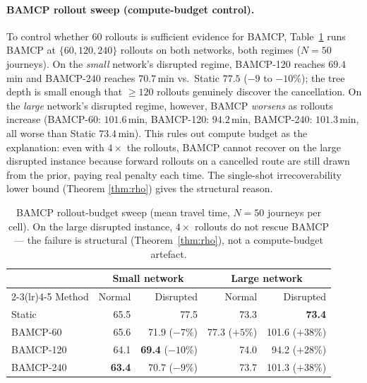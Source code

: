 \documentclass[11pt]{article}
\theoremstyle{definition}
\theoremstyle{remark}
\begin{document}
\paragraph{BAMCP rollout sweep (compute-budget control).} To
control whether $60$ rollouts is sufficient evidence for
BAMCP, Table~\ref{tab:bamcp_sweep} runs BAMCP at $\{60, 120, 240\}$
rollouts on both networks, both regimes ($N{=}50$ journeys). On the
\emph{small} network's disrupted regime, BAMCP-120 reaches $69.4$\,min
and BAMCP-240 reaches $70.7$\,min vs.\ Static $77.5$ ($-9$ to $-10\%$);
the tree depth is small enough that $\geq 120$ rollouts genuinely
discover the cancellation. On the \emph{large} network's disrupted
regime, however, BAMCP \emph{worsens} as rollouts increase (BAMCP-60:
$101.6$\,min, BAMCP-120: $94.2$\,min, BAMCP-240: $101.3$\,min, all
worse than Static $73.4$\,min). This rules out compute budget as the
explanation: even with $4{\times}$ the rollouts, BAMCP cannot recover
on the large disrupted instance because forward rollouts on a
cancelled route are still drawn from the prior, paying real penalty
each time. The single-shot irrecoverability lower bound (Theorem
\ref{thm:rho}) gives the structural reason.

\begin{table}[t]
\centering
\caption{BAMCP rollout-budget sweep (mean travel time, $N{=}50$ journeys
per cell). On the large disrupted instance, $4{\times}$ rollouts do
not rescue BAMCP --- the failure is structural (Theorem~\ref{thm:rho}),
not a compute-budget artefact.}
\label{tab:bamcp_sweep}
\begin{tabular}{l rrrr}
\toprule
                 & \multicolumn{2}{c}{Small network} & \multicolumn{2}{c}{Large network} \\
\cmidrule(lr){2-3}\cmidrule(lr){4-5}
Method           & Normal & Disrupted & Normal & Disrupted \\
\midrule
Static           & 65.5 & 77.5 & 73.3 & \textbf{73.4} \\
BAMCP-60         & 65.6 & 71.9 ($-7\%$) & 77.3 ($+5\%$) & 101.6 ($+38\%$) \\
BAMCP-120        & 64.1 & \textbf{69.4} ($-10\%$) & 74.0 & 94.2 ($+28\%$) \\
BAMCP-240        & \textbf{63.4} & 70.7 ($-9\%$) & 73.7 & 101.3 ($+38\%$) \\
\bottomrule
\end{tabular}
\end{table}

\end{document}
